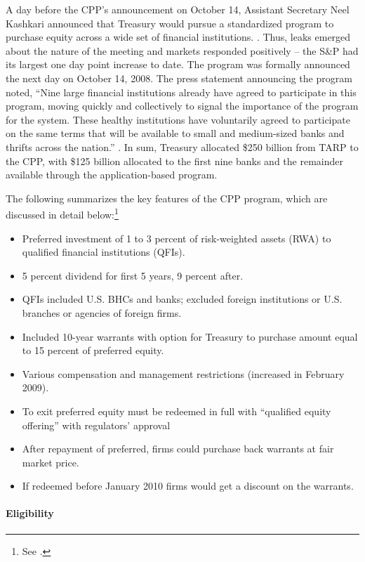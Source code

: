 \documentclass[12pt]{article}
\begin{document}
A day before the CPP's announcement on October 14, Assistant Secretary Neel Kashkari announced that Treasury would pursue a standardized program to purchase equity across a wide set of financial institutions. \citep{Ba}. Thus, leaks emerged about the nature of the meeting and markets responded positively -- the S\&P had its largest one day point increase to date. The program was formally announced the next day on October 14, 2008. The press statement announcing the program noted, ``Nine large financial institutions already have agreed to participate in this program, moving quickly and collectively to signal the importance of the program for the system. These healthy institutions have voluntarily agreed to participate on the same terms that will be available to small and medium-sized banks and thrifts across the nation.'' \citep{CPPAnnouncement}. In sum, Treasury allocated \$250 billion from TARP to the CPP, with \$125 billion allocated to the first nine banks and the remainder available through the application-based program.

The following summarizes the key features of the CPP program, which are discussed in detail below:\footnote{See \citet{mofo}.}

\begin{itemize}[label={--}]
\item Preferred investment of 1 to 3 percent of risk-weighted assets (RWA) to qualified financial institutions (QFIs).
\item 5 percent dividend for first 5 years, 9 percent after.
\item QFIs included U.S. BHCs and banks; excluded foreign institutions or U.S. branches or agencies of foreign firms.
\item Included 10-year warrants with option for Treasury to purchase amount equal to 15 percent of preferred equity.
\item Various compensation and management restrictions (increased in February 2009).
\item To exit preferred equity must be redeemed in full with ``qualified equity offering'' with regulators' approval
\item After repayment of preferred, firms could purchase back warrants at fair market price.
\item If redeemed before January 2010 firms would get a discount on the warrants.
\end{itemize}

\paragraph{Eligibility}
\end{document}
